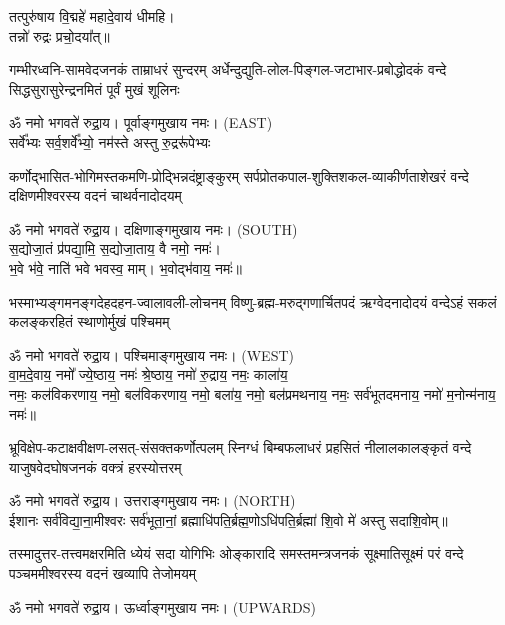 {\small\closesection}

\begin{center}
तत्पुरु॑षाय वि॒द्महे॑ महादे॒वाय॑ धीमहि।\\
तन्नो॑ रुद्रः प्रचो॒दया᳚त्॥

{गम्भीरध्वनि-सामवेदजनकं ताम्राधरं सुन्दरम्}
{अर्धेन्दुद्युति-लोल-पिङ्गल-जटाभार-प्रबोद्धोदकं}
{वन्दे सिद्धसुरासुरेन्द्रनमितं पूर्वं मुखं शूलिनः}

ॐ नमो भगवते॑ रुद्रा॒य। पूर्वाङ्गमुखाय नमः। {\scriptsize (EAST)}\\[1em]

{सर्वे᳚भ्यः सर्व॒शर्वे᳚भ्यो॒ नम॑स्ते अस्तु रु॒द्ररू॑पेभ्यः}

{कर्णोद्भासित-भोगिमस्तकमणि-प्रोद्भिन्नदंष्ट्राङ्कुरम्}
{सर्पप्रोतकपाल-शुक्तिशकल-व्याकीर्णताशेखरं}
{वन्दे दक्षिणमीश्वरस्य वदनं चाथर्वनादोदयम्}

ॐ नमो भगवते॑ रुद्रा॒य। दक्षिणाङ्गमुखाय नमः। {\scriptsize (SOUTH)}\\[1em]

स॒द्योजा॒तं प्र॑पद्या॒मि॒ स॒द्योजा॒ताय॒ वै नमो॒ नमः॑।\\
भ॒वे भ॑वे॒ नाति॑ भवे भवस्व॒ माम्। भ॒वोद्भ॑वाय॒ नमः॑॥ 

{भस्माभ्यङ्गमनङ्गदेहदहन-ज्वालावली-लोचनम्}
{विष्णु-ब्रह्म-मरुद्गणार्चितपदं ऋग्वेदनादोदयं}
{वन्देऽहं सकलं कलङ्करहितं स्थाणोर्मुखं पश्चिमम्}

ॐ नमो भगवते॑ रुद्रा॒य। पश्चिमाङ्गमुखाय नमः। {\scriptsize (WEST)}\\[1em]

वा॒म॒दे॒वाय॒ नमो᳚ ज्ये॒ष्ठाय॒ नमः॑ श्रे॒ष्ठाय॒ नमो॑ रु॒द्राय॒ नमः॒ काला॑य॒\\ नमः॒ कल॑विकरणाय॒ नमो॒ बल॑विकरणाय॒ नमो॒ बला॑य॒ नमो॒ बल॑प्रमथनाय॒ नमः॒ सर्व॑भूतदमनाय॒ नमो॑ म॒नोन्म॑नाय॒ नमः॑॥

{भ्रूविक्षेप-कटाक्षवीक्षण-लसत्-संसक्तकर्णोत्पलम्}
{स्निग्धं बिम्बफलाधरं प्रहसितं नीलालकालङ्कृतं}
{वन्दे याजुषवेदघोषजनकं वक्त्रं हरस्योत्तरम्}

ॐ नमो भगवते॑ रुद्रा॒य। उत्तराङ्गमुखाय नमः। {\scriptsize (NORTH)}\\[1em]

ईशानः सर्व॑विद्या॒ना॒मीश्वरः सर्व॑भूता॒नां॒ ब्रह्माधि॑पति॒र्ब्रह्म॒णोऽधि॑पति॒र्ब्रह्मा॑ शि॒वो मे॑ अस्तु सदाशि॒वोम्॥

{तस्मादुत्तर-तत्त्वमक्षरमिति ध्येयं सदा योगिभिः}
{ओङ्कारादि समस्तमन्त्रजनकं सूक्ष्मातिसूक्ष्मं परं}
{वन्दे पञ्चममीश्वरस्य वदनं खव्यापि तेजोमयम्}

ॐ नमो भगवते॑ रुद्रा॒य। ऊर्ध्वाङ्गमुखाय नमः। {\scriptsize (UPWARDS)}\\[1em]

\end{center}

